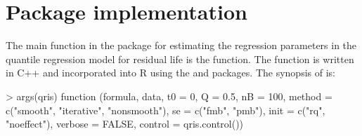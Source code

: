 \section{Package implementation} 
\label{sec:implementation}

The main function in the  package for
estimating the regression parameters in the quantile regression model for residual life is the 
 function.
The  function is written in C++ and incorporated into R
using the  \citep{Rcpppackage} and  \citep{RcppArmadillopackage} packages.
The synopsis of  is:

\begin{example}
  > args(qris)
  function (formula, data, t0 = 0, Q = 0.5, nB = 100, method = c("smooth", 
  "iterative", "nonsmooth"), se = c("fmb", 
  "pmb"), init = c("rq", "noeffect"), verbose = FALSE, 
  control = qris.control()) 
\end{example}
% 

